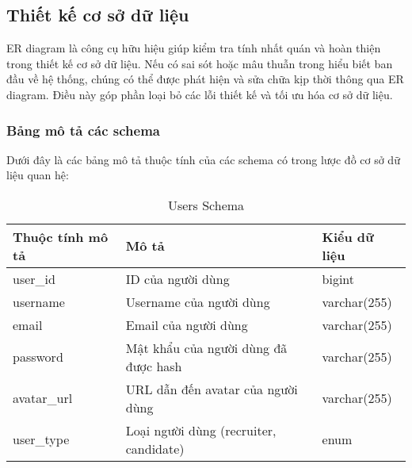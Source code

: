 \subsection{Thiết kế cơ sở dữ liệu}
ER diagram là công cụ hữu hiệu giúp kiểm tra tính nhất quán và hoàn thiện trong thiết kế cơ sở dữ liệu. Nếu có sai sót hoặc mâu thuẫn trong hiểu biết ban đầu về hệ thống, chúng có thể được phát hiện và sửa chữa kịp thời thông qua ER diagram. Điều này góp phần loại bỏ các lỗi thiết kế và tối ưu hóa cơ sở dữ liệu.

\subsubsection{Bảng mô tả các schema}
Dưới đây là các bảng mô tả thuộc tính của các schema có trong lược đồ cơ sở dữ liệu quan hệ:

\begin{table}[H]
\centering
\renewcommand{\arraystretch}{1.5}
\begin{tabular}{|l|p{7cm}|p{4cm}|}
\hline
\textbf{Thuộc tính mô tả} & \textbf{Mô tả} & \textbf{Kiểu dữ liệu} \\
\hline
user\_id & ID của người dùng & bigint \\
\hline
username & Username của người dùng & varchar(255) \\
\hline
email & Email của người dùng & varchar(255) \\
\hline
password & Mật khẩu của người dùng đã được hash & varchar(255) \\
\hline
avatar\_url & URL dẫn đến avatar của người dùng & varchar(255) \\
\hline
user\_type & Loại người dùng (recruiter, candidate) & enum \\
\hline
\end{tabular}
\caption{Users Schema}
\end{table}

